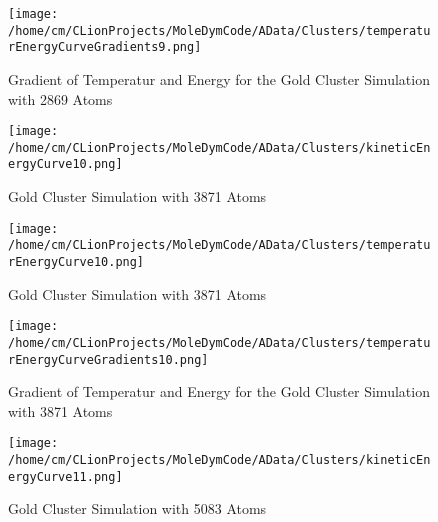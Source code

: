 \begin{figure}[!h] 
    \begin{center} 
        \texttt{[image: /home/cm/CLionProjects/MoleDymCode/AData/Clusters/temperaturEnergyCurveGradients9.png]} 
    \end{center} 
    \caption[Gradient of Temperatur and Energy for the Gold Cluster Simulation with 2869 Atoms]{Gradient of Temperatur and Energy for the Gold Cluster Simulation with 2869 Atoms} 
    \label{GoldClusterSimulationGradient2869} 
\end{figure} 
 
\begin{figure}[!h] 
    \begin{center} 
        \texttt{[image: /home/cm/CLionProjects/MoleDymCode/AData/Clusters/kineticEnergyCurve10.png]} 
    \end{center} 
    \caption[Gold Cluster Simulation with 3871 Atoms]{Gold Cluster Simulation with 3871 Atoms} 
    \label{GoldClusterSimulationKineticTime3871} 
\end{figure} 
 
\begin{figure}[!h] 
    \begin{center} 
        \texttt{[image: /home/cm/CLionProjects/MoleDymCode/AData/Clusters/temperaturEnergyCurve10.png]} 
    \end{center} 
    \caption[Gold Cluster Simulation with 3871 Atoms]{Gold Cluster Simulation with 3871 Atoms} 
    \label{GoldClusterSimulationTemperaturEnergy3871} 
\end{figure} 
 
\begin{figure}[!h] 
    \begin{center} 
        \texttt{[image: /home/cm/CLionProjects/MoleDymCode/AData/Clusters/temperaturEnergyCurveGradients10.png]} 
    \end{center} 
    \caption[Gradient of Temperatur and Energy for the Gold Cluster Simulation with 3871 Atoms]{Gradient of Temperatur and Energy for the Gold Cluster Simulation with 3871 Atoms} 
    \label{GoldClusterSimulationGradient3871} 
\end{figure} 
 
\begin{figure}[!h] 
    \begin{center} 
        \texttt{[image: /home/cm/CLionProjects/MoleDymCode/AData/Clusters/kineticEnergyCurve11.png]} 
    \end{center} 
    \caption[Gold Cluster Simulation with 5083 Atoms]{Gold Cluster Simulation with 5083 Atoms} 
    \label{GoldClusterSimulationKineticTime5083} 
\end{figure} 
 
